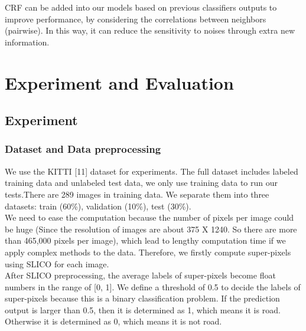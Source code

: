 \documentclass{article} %
\begin{document}
CRF can be added into our models based on previous classifiers outputs to improve performance, by considering the correlations between neighbors (pairwise). In this way, it can reduce the sensitivity to noises through extra new information.

\section{Experiment and Evaluation}
\label{headings}

\subsection{Experiment}
\subsubsection{Dataset and Data preprocessing}
We use the KITTI [11] dataset for experiments. The full dataset includes labeled training data and unlabeled test data, we only use training data to run our tests.There are 289 images in training data. We separate them into three datasets: train (60\%), validation (10\%), test (30\%).\\

We need to ease the computation because the number of pixels per image could be huge (Since the resolution of images are about 375 X 1240. So there are more than 465,000 pixels per image), which lead to lengthy computation time if we apply complex methods to the data. Therefore, we firstly compute super-pixels using SLICO for each image. \\

After SLICO preprocessing, the average labels of super-pixels become float numbers in the range of [0, 1]. We define a threshold of 0.5 to decide the labels of super-pixels because this is a binary classification problem. If the prediction output is larger than 0.5, then it is determined as 1, which means it is road. Otherwise it is determined as 0, which means it is not road. 
\end{document}
